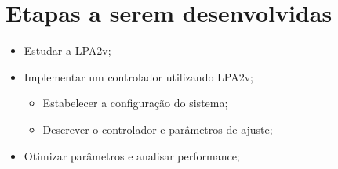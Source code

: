 \section{Etapas a serem desenvolvidas}

\begin{itemize}
\item Estudar a LPA2v;
\item Implementar um controlador utilizando LPA2v;
	\begin{itemize}
	\item Estabelecer a configuração do sistema;
	\item Descrever o controlador e parâmetros de ajuste;
	\end{itemize}
\item Otimizar parâmetros e analisar performance;
\end{itemize}



